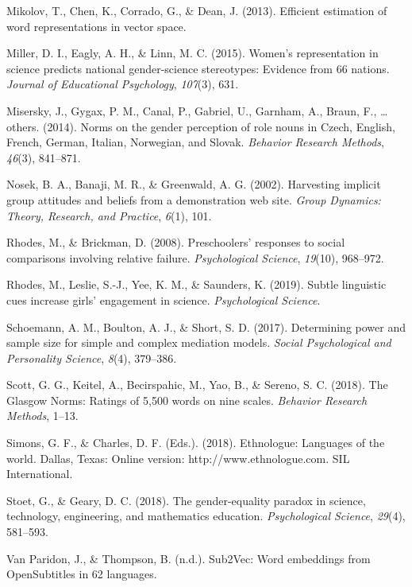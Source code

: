 \documentclass[man,floatsintext]{apa6}
\begin{document}
\leavevmode\hypertarget{ref-mikolov2013efficient}{}%
Mikolov, T., Chen, K., Corrado, G., \& Dean, J. (2013). Efficient estimation of word representations in vector space.

\leavevmode\hypertarget{ref-miller2015women}{}%
Miller, D. I., Eagly, A. H., \& Linn, M. C. (2015). Women's representation in science predicts national gender-science stereotypes: Evidence from 66 nations. \emph{Journal of Educational Psychology}, \emph{107}(3), 631.

\leavevmode\hypertarget{ref-misersky2014norms}{}%
Misersky, J., Gygax, P. M., Canal, P., Gabriel, U., Garnham, A., Braun, F., \ldots{} others. (2014). Norms on the gender perception of role nouns in Czech, English, French, German, Italian, Norwegian, and Slovak. \emph{Behavior Research Methods}, \emph{46}(3), 841--871.

\leavevmode\hypertarget{ref-nosek2002harvesting}{}%
Nosek, B. A., Banaji, M. R., \& Greenwald, A. G. (2002). Harvesting implicit group attitudes and beliefs from a demonstration web site. \emph{Group Dynamics: Theory, Research, and Practice}, \emph{6}(1), 101.

\leavevmode\hypertarget{ref-rhodes2008preschoolers}{}%
Rhodes, M., \& Brickman, D. (2008). Preschoolers' responses to social comparisons involving relative failure. \emph{Psychological Science}, \emph{19}(10), 968--972.

\leavevmode\hypertarget{ref-rhodes2018subtle}{}%
Rhodes, M., Leslie, S.-J., Yee, K. M., \& Saunders, K. (2019). Subtle linguistic cues increase girls' engagement in science. \emph{Psychological Science}.

\leavevmode\hypertarget{ref-schoemann2017determining}{}%
Schoemann, A. M., Boulton, A. J., \& Short, S. D. (2017). Determining power and sample size for simple and complex mediation models. \emph{Social Psychological and Personality Science}, \emph{8}(4), 379--386.

\leavevmode\hypertarget{ref-scott2018glasgow}{}%
Scott, G. G., Keitel, A., Becirspahic, M., Yao, B., \& Sereno, S. C. (2018). The Glasgow Norms: Ratings of 5,500 words on nine scales. \emph{Behavior Research Methods}, 1--13.

\leavevmode\hypertarget{ref-simons2018}{}%
Simons, G. F., \& Charles, D. F. (Eds.). (2018). Ethnologue: Languages of the world. Dallas, Texas: Online version: http://www.ethnologue.com. SIL International.

\leavevmode\hypertarget{ref-stoet2018gender}{}%
Stoet, G., \& Geary, D. C. (2018). The gender-equality paradox in science, technology, engineering, and mathematics education. \emph{Psychological Science}, \emph{29}(4), 581--593.

\leavevmode\hypertarget{ref-vanparidon}{}%
Van Paridon, J., \& Thompson, B. (n.d.). Sub2Vec: Word embeddings from OpenSubtitles in 62 languages.

\endgroup
\end{document}
